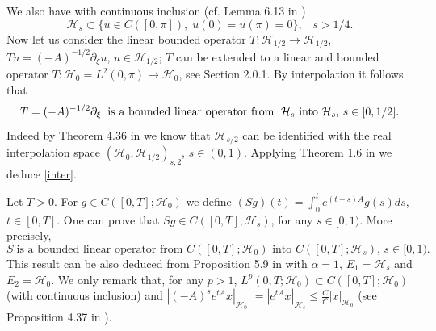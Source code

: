 \documentclass[preprint]{imsart}
\begin{document}
 
 \vskip 1mm 
 We also have with  continuous inclusion (cf. Lemma 6.13 in \cite{hairer})
 \begin{equation}\label{sob2}
{\mathcal H}_{s} \subset \{ u \in C([0, \pi]),\; u(0)=u(\pi)=0\}, \;\;\; s > 1/4.
\end{equation}
 Now let us consider the linear bounded operator $T : {\mathcal H}_{1/2} \to {\mathcal H}_{1/2}$, $T u = (-A)^{-1/2} \partial_{\xi} u $, $u \in {\mathcal H}_{1/2}$;  $T$ can be extended to a linear and bounded operator   $T : {\mathcal H}_0 = L^2(0, \pi)\to {\mathcal H}_0$, see  Section 2.0.1. 
By interpolation  it follows that 
\begin{equation}\label{inter}
 T =(-A)^{-1/2} \partial_{\xi} \;\; \text{is a bounded linear operator from    $\; {\mathcal H}_{s}$ into $ {\mathcal H}_s$, $s \in [0,1/2]$}.
\end{equation}
Indeed by Theorem 4.36 in \cite{interpola} we know that 
  ${\mathcal H}_{s/2} $ can be identified with the real interpolation space $({\mathcal H}_0, {\mathcal H}_{1/2})_{s,2}$, $s \in (0, 1)$. Applying Theorem 1.6 in \cite{interpola}   we deduce \eqref{inter}.   

\vskip 1mm Let $T>0$.  For $g \in C([0,T]; {\mathcal H}_0)$ we define $(Sg)(t) =  \int_{0}^{t} e^{(  t-s)  A} g  (s) ds$, $t \in [0,T]$. 
One can prove that 
 $Sg \in C([0,T]; {\mathcal H}_s)$, for any  $s \in [0,1)$. More precisely, 
\begin{equation}\label{bou1}
S \; \text{is a bounded linear operator from $C([0,T]; {\mathcal H}_0)$ into $C([0,T]; {\mathcal H}_s)$, $s \in [0,1)$.}
\end{equation}
 This result can be also deduced from Proposition 5.9 in \cite{DZ} with $\alpha =1$, $E_1 = {\mathcal H}_s$ and $E_2 = {\mathcal H}_0$. We only remark that, for any $p>1$, $L^p (0,T; {\mathcal H}_0) \subset C([0,T]; {\mathcal H}_0)$ (with continuous inclusion) and  $|(-A)^{s} e^{tA} x|_{{\mathcal H}_0}$ $=| e^{tA} x|_{{\mathcal H}_s} \le \frac{C}{t^{s}} |x|_{{\mathcal H}_0}$ (see Proposition 4.37 in \cite{hairer}). 
  
\end{document}
